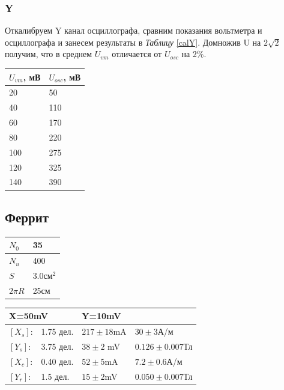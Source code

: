 \documentclass[12pt]{article}
\begin{document}
\subsubsection{Y}
\begin{minipage}{0.4\textwidth}
Откалибруем Y канал осциллографа, сравним показания вольтметра и осциллографа и занесем результаты в \textit{Таблицу} \ref{calY}. Домножив U на $2\sqrt{2}$ получим, что в среднем  $U_{vm}$ отличается от $U_{osc}$ на 2\%.
\end{minipage}
\begin{minipage}{0.6\textwidth}
\begin{center}
\begin{tabular}{|l|l|}
\hline
$U_{vm}$, мВ & $U_{osc}$, мВ \\ \hline
20          & 50            \\ \hline
40          & 110           \\ \hline
60          & 170           \\ \hline
80          & 220           \\ \hline
100         & 275           \\ \hline
120         & 325           \\ \hline
140         & 390           \\ \hline
\end{tabular}
\label{calY}
\end{center}
\end{minipage}
\subsection{Феррит}
\begin{minipage}{0.4\textwidth}
\begin{tabular}{|l|l|}
\hline
$N_0$ & 35        \\ \hline
$N_u$ & 400       \\ \hline
$S$   & 3.0см$^2$ \\ \hline
$2\pi R$ & 25см \\ \hline
\end{tabular}
\end{minipage}
\begin{minipage}{0.5\textwidth}
\begin{tabular}{|l|l|l|l|}
\hline
\multicolumn{2}{|l|}{X=50mV} & \multicolumn{2}{l|}{Y=10mV} \\ \hline
$[X_s]$:    & 1.75 дел.    & $217 \pm 18 $mA      &    $30 \pm 3$А/м  \\ \hline
$[Y_s]$:    & 3.75 дел.    & $38 \pm 2$ mV        &   $0.126 \pm 0.007$Тл   \\ \hline
$[X_c]$:    & 0.40 дел.    & $52 \pm 5 $mA        &    $7.2 \pm 0.6$А/м   \\ \hline
$[Y_r]$:    & 1.5 дел.     & $15 \pm 2$mV         &   $0.050 \pm 0.007$Тл   \\ \hline
\end{tabular}
\end{minipage}\\
\end{document}
